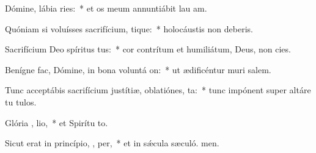 \item Dómine, lábia  ries:~* et os meum annuntiábit lau am.
\item Quóniam si voluísses sacrifícium,  tique:~* holocáustis non deberis.
\item Sacrifícium Deo spíritus tus:~* cor contrítum et humiliátum, Deus, non cies.
\item Benígne fac, Dómine, in bona voluntá  on:~* ut ædificéntur muri salem.
\item Tunc acceptábis sacrifícium justítiæ, oblatiónes,  ta:~* tunc impónent super altáre tu tulos.
\item Glória ,  lio,~* et Spirítu to.
\item Sicut erat in princípio,  ,  per,~* et in sǽcula sæculó. men.
